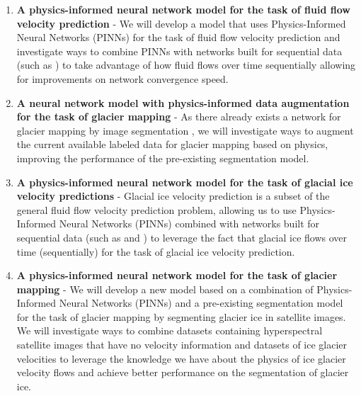 \begin{enumerate}
    \item \textbf{A physics-informed neural network model for the task of fluid flow velocity prediction} - We will develop a model that uses Physics-Informed Neural Networks (PINNs) \cite{PINNS} for the task of fluid flow velocity prediction and investigate ways to combine PINNs with networks built for sequential data (such as \cite{LSTM}) to take advantage of how fluid flows over time sequentially allowing for improvements on network convergence speed.

    \item \textbf{A neural network model with physics-informed data augmentation for the task of glacier mapping} - As there already exists a network for glacier mapping by image segmentation \cite{Bibek2023}, we will investigate ways to augment the current available labeled data for glacier mapping based on physics, improving the performance of the pre-existing segmentation model. 

    \item \textbf{A physics-informed neural network model for the task of glacial ice velocity predictions} - Glacial ice velocity prediction is a subset of the general fluid flow velocity prediction problem, allowing us to use Physics-Informed Neural Networks (PINNs) \cite{PINNS} combined with networks built for sequential data (such as \cite{LSTM} and \cite{Attention1}) to leverage the fact that glacial ice flows over time (sequentially) for the task of glacial ice velocity prediction.

    \item \textbf{A physics-informed neural network model for the task of glacier mapping} - We will develop a new model based on a combination of Physics-Informed Neural Networks (PINNs) \cite{PINNS} and a pre-existing segmentation model \cite{Bibek2023} for the task of glacier mapping by segmenting glacier ice in satellite images. We will investigate ways to combine datasets containing hyperspectral satellite images that have no velocity information and datasets of ice glacier velocities to leverage the knowledge we have about the physics of ice glacier velocity flows and achieve better performance on the segmentation of glacier ice.

    

\end{enumerate}
